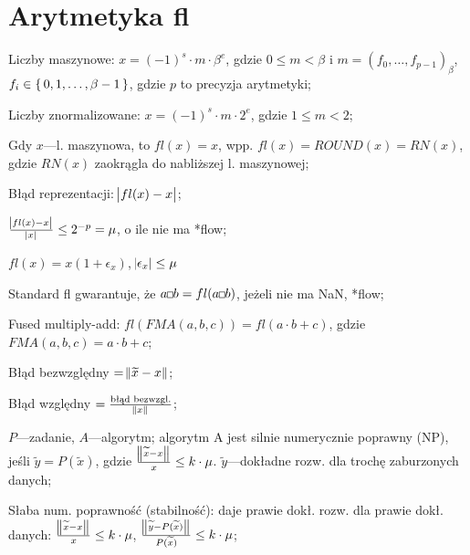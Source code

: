 \section{Arytmetyka fl}

\entry
Liczby maszynowe: $x=(-1)^s \cdot m \cdot \beta^e$, gdzie $0\leq m < \beta$ i $m=(f_0, \ldots, f_{p-1})_\beta$, $f_i\in\set{0,1,\ldots,\beta-1}$, gdzie $p$ to precyzja arytmetyki;

\entry
Liczby znormalizowane: $x=(-1)^s\cdot m \cdot 2^e$, gdzie $1\leq m < 2$;

\entry
Gdy $x$---l. maszynowa, to $fl(x)=x$, wpp. $fl(x)=ROUND(x)=RN(x)$, gdzie $RN(x)$ zaokrągla do nabliższej l. maszynowej;

\entry
Błąd reprezentacji: $\abs{fl(x) - x}$;

\entry
$\frac{\abs{fl(x) - x}}{\abs{x}}\leq 2^{-p}=\mu$, o ile nie ma *flow;

\entry
$fl(x) = x(1+\epsilon_x)$, $\abs{\epsilon_x}\leq \mu$

\entry
Standard fl gwarantuje, że $a \Hsquare b = fl(a\Hsquare b)$, jeżeli nie ma NaN, *flow;

\entry
Fused multiply-add: $fl(FMA(a,b,c)) = fl(a \cdot b + c)$, gdzie $FMA(a,b,c)=a\cdot b + c$;


\entry
Błąd bezwzględny $=\norm{\widetilde{x} - x}$;

\entry
Błąd względny $=\frac{\text{błąd bezwzgl.}}{\norm{x}}$;

\entry
$P$---zadanie, $A$---algorytm; algorytm A jest silnie numerycznie poprawny (NP), jeśli $\widetilde{y} = P(\widetilde{x})$, gdzie $\frac{\norm{\widetilde{x}-x}}{x}\leq k\cdot\mu$. $\widetilde{y}$---dokładne rozw. dla trochę zaburzonych danych;

\entry
Słaba num. poprawność (stabilność): daje prawie dokł. rozw. dla prawie dokł. danych: $\frac{\norm{\widetilde{x}-x}}{x}\leq k\cdot\mu$, $\frac{\norm{\widetilde{y}-P(\widetilde{x})}}{P(\widetilde{x})}\leq k\cdot\mu$;

